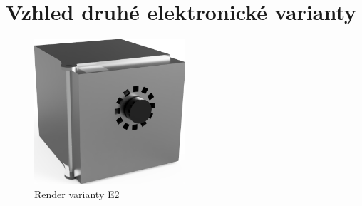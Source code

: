 \newcommand\OdsazeniNadpisu{10mm}
\section{Vzhled druhé elektronické varianty} 
\begin{figure}
	
    \centering
    \includegraphics[width=0.5\textwidth]{kapitoly/obrazky/E2/predni_render.png}
    \caption{Render varianty E2}
    \label{fig:E2-render}
\end{figure}


